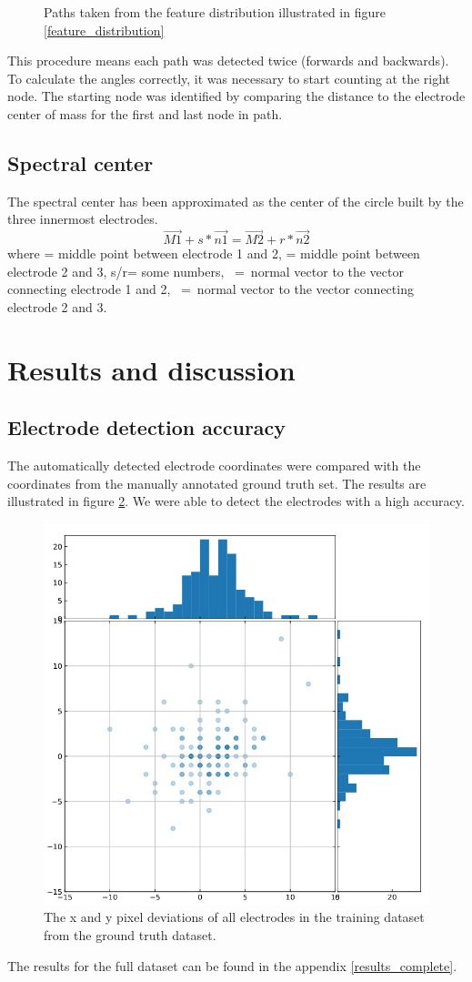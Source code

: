 \documentclass[a4paper, 10pt, twocolumn]{article}
\begin{document}
\begin{figure}[H]
\begin{subfigure}[c]{0.32\textwidth}
\end{subfigure}
\caption{Paths taken from the feature distribution illustrated in figure \ref{feature_distribution}}
\label{graphs}
\end{figure}
This procedure means each path was detected twice (forwards and backwards). To calculate the angles correctly, it was necessary to start counting at the right node. The starting node was identified by comparing the distance to the electrode center of mass for the first and last node in path.

\subsection{Spectral center}
The spectral center has been approximated as the center of the circle built by the three innermost electrodes\cite{spectral_center}.
$$\overrightarrow{M1}+s*\overrightarrow{n1}=\overrightarrow{M2}+r*\overrightarrow{n2}$$where  = middle point between electrode 1 and 2,  = middle point between electrode 2 and 3, s/r= some numbers, \ =\ normal vector to the vector connecting electrode 1 and 2, \ =\ normal vector to the vector connecting electrode 2 and 3.


\section{Results and discussion}
\subsection{Electrode detection accuracy}
The automatically detected electrode coordinates were compared with the coordinates from the manually annotated ground truth set. The results are illustrated in figure \ref{results_coord}. We were able to detect the electrodes with a high accuracy.
\begin{figure}[ht]
	\centering
  \includegraphics[width=.5\textwidth]{results_coord.jpeg}
	\caption{The x and y pixel deviations of all electrodes in the training dataset from the ground truth dataset.}
	\label{results_coord}
\end{figure}
The results for the full dataset can be found in the appendix \ref{results_complete}.
\end{document}

